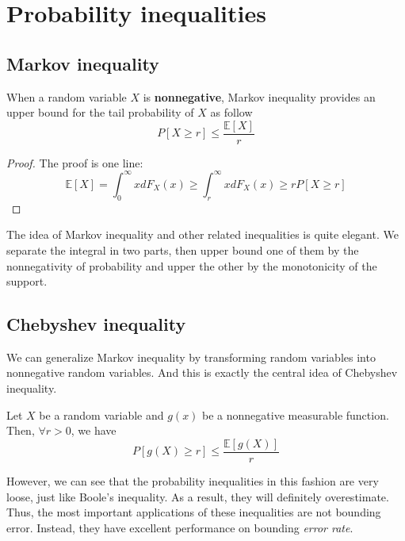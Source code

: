 \documentclass[../Distributions.tex]{subfiles}
\begin{document}
\section{Probability inequalities}
\subsection{Markov inequality}
When a random variable $X$ is {\bf nonnegative}, Markov inequality provides an upper bound for the tail probability of $X$ as follow
$$P[X\geq r]\leq\frac{\mathbb{E}[X]}{r}$$
\begin{proof}
	The proof is one line:
	$$\mathbb{E}[X] = \int_0^{\infty}xdF_X(x)\geq\int_r^{\infty}xdF_X(x)\geq rP[X\geq r]$$
\end{proof}
\begin{intuition}
	The idea of Markov inequality and other related inequalities is quite elegant. We separate the integral in two parts, then upper bound one of them by the nonnegativity of probability and upper the other by the monotonicity of the support.
\end{intuition}

\subsection{Chebyshev inequality}
We can generalize Markov inequality by transforming random variables into nonnegative random variables. And this is exactly the central idea of Chebyshev inequality.
\begin{theorem}
	Let $X$ be a random variable and $g(x)$ be a nonnegative measurable function. Then, $\forall r>0$, we have
	$$P[g(X)\geq r]\leq\frac{\mathbb{E}[g(X)]}{r}$$
\end{theorem}

However, we can see that the probability inequalities in this fashion are very loose, just like Boole's inequality. As a result, they will definitely overestimate. Thus, the most important applications of these inequalities are not bounding error. Instead, they have excellent performance on bounding {\it error rate}.
\end{document}
